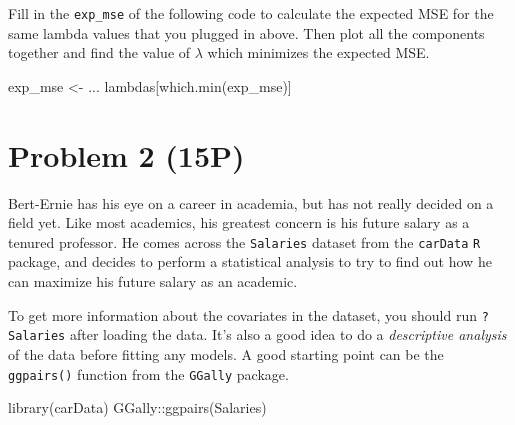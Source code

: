 \documentclass[
]{article}
\newenvironment{Shaded}{\begin{snugshade}}{\end{snugshade}}
\newcommand{\FunctionTok}[1]{\textcolor[rgb]{0.00,0.00,0.00}{#1}}
\newcommand{\NormalTok}[1]{#1}
\newcommand{\OtherTok}[1]{\textcolor[rgb]{0.56,0.35,0.01}{#1}}
\newcommand{\SpecialCharTok}[1]{\textcolor[rgb]{0.00,0.00,0.00}{#1}}
\begin{document}
Fill in the \texttt{exp\_mse} of the following code to calculate the
expected MSE for the same lambda values that you plugged in above. Then
plot all the components together and find the value of \(\lambda\) which
minimizes the expected MSE.

\begin{Shaded}
\begin{Highlighting}[]
\NormalTok{exp\_mse }\OtherTok{\textless{}{-}}\NormalTok{ ...}
\NormalTok{lambdas[}\FunctionTok{which.min}\NormalTok{(exp\_mse)]}
\end{Highlighting}
\end{Shaded}

\hypertarget{problem-2-15p}{%
\section{Problem 2 (15P)}\label{problem-2-15p}}

Bert-Ernie has his eye on a career in academia, but has not really
decided on a field yet. Like most academics, his greatest concern is his
future salary as a tenured professor. He comes across the
\texttt{Salaries} dataset from the \texttt{carData} \texttt{R} package,
and decides to perform a statistical analysis to try to find out how he
can maximize his future salary as an academic.

To get more information about the covariates in the dataset, you should
run \texttt{?Salaries} after loading the data. It's also a good idea to
do a \emph{descriptive analysis} of the data before fitting any models.
A good starting point can be the \texttt{ggpairs()} function from the
\texttt{GGally} package.

\begin{Shaded}
\begin{Highlighting}[]
\FunctionTok{library}\NormalTok{(carData)}
\NormalTok{GGally}\SpecialCharTok{::}\FunctionTok{ggpairs}\NormalTok{(Salaries)}
\end{Highlighting}
\end{Shaded}
\end{document}
